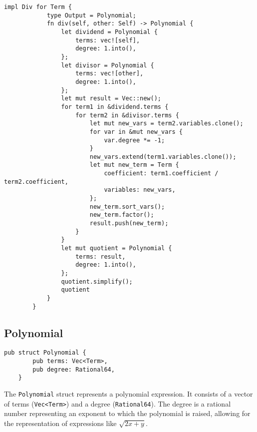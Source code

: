     \begin{lstlisting}[caption={The implementation of the division operation for the \texttt{Term} struct}, label={lst:term-div}]
        impl Div for Term {
            type Output = Polynomial;
            fn div(self, other: Self) -> Polynomial {
                let dividend = Polynomial {
                    terms: vec![self],
                    degree: 1.into(),
                };
                let divisor = Polynomial {
                    terms: vec![other],
                    degree: 1.into(),
                };
                let mut result = Vec::new();
                for term1 in &dividend.terms {
                    for term2 in &divisor.terms {
                        let mut new_vars = term2.variables.clone();
                        for var in &mut new_vars {
                            var.degree *= -1;
                        }
                        new_vars.extend(term1.variables.clone());
                        let mut new_term = Term {
                            coefficient: term1.coefficient / term2.coefficient,
                            variables: new_vars,
                        };
                        new_term.sort_vars();
                        new_term.factor();
                        result.push(new_term);
                    }
                }
                let mut quotient = Polynomial {
                    terms: result,
                    degree: 1.into(),
                };
                quotient.simplify();
                quotient
            }
        }
    \end{lstlisting}

\subsection{Polynomial}\label{subsec:polynomial}

\begin{lstlisting}[caption={The \texttt{Polynomial} struct}, label={lst:polynomial}]
    pub struct Polynomial {
        pub terms: Vec<Term>,
        pub degree: Rational64,
    }
\end{lstlisting}


The \verb|Polynomial| struct represents a polynomial expression. It consists of a vector of terms (\verb|Vec<Term>|) and a degree (\verb|Rational64|). The degree is a rational number representing an exponent to which the polynomial is raised, allowing for the representation of expressions like $\sqrt{2x + y}$.

